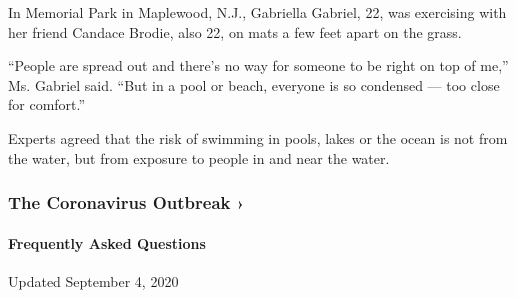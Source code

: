 In Memorial Park in Maplewood, N.J., Gabriella Gabriel, 22, was
exercising with her friend Candace Brodie, also 22, on mats a few feet
apart on the grass.

``People are spread out and there's no way for someone to be right on
top of me,'' Ms. Gabriel said. ``But in a pool or beach, everyone is so
condensed --- too close for comfort.''

Experts agreed that the risk of swimming in pools, lakes or the ocean is
not from the water, but from exposure to people in and near the water.

\href{https://www.nytimes3xbfgragh.onion/news-event/coronavirus?action=click\&pgtype=Article\&state=default\&region=MAIN_CONTENT_3\&context=storylines_faq}{}

\hypertarget{the-coronavirus-outbreak-}{%
\subsubsection{The Coronavirus Outbreak
›}\label{the-coronavirus-outbreak-}}

\hypertarget{frequently-asked-questions}{%
\paragraph{Frequently Asked
Questions}\label{frequently-asked-questions}}

Updated September 4, 2020

